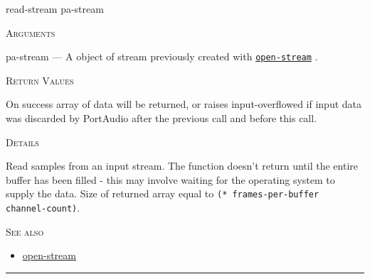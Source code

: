 \documentclass[a4paper]{report}
\begin{document}
    \label{portaudio__fun__read-stream}
    \begin{defun}[Function]
    read-stream pa-stream


    
    \bigskip
    \textsc{Arguments}

pa-stream
	--- A object of stream previously created with \hyperref[portaudio__fun__open-stream]{\texttt{open-stream}}
  .




    
    \bigskip
    \textsc{Return Values}


On success array of data will be returned, or raises input-overflowed if input data was discarded by PortAudio after the previous call and before this call. 


	
    \bigskip
    \textsc{Details}

Read samples from an input stream. The function doesn't return until the entire buffer has been filled - this may involve waiting for the operating system to supply the data. Size of returned array equal to \texttt{(* frames-per-buffer channel-count)}.






      
    \bigskip
    \textsc{See also}


	
    \begin{itemize}
    
	  
    \item
    \hyperref[portaudio__fun__open-stream]{open-stream}
    
	
    \end{itemize}
  
      


    
    \end{defun}
  
  

    \rule{\linewidth}{0.1mm}
    
\end{document}
